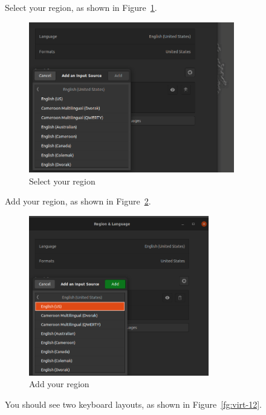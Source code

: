 Select your region, as shown in Figure~\ref{fg:virt-10}.

\begin{figure}[H]
\begin{center}
\includegraphics[width=0.8\textwidth]{virt-10}
\caption{Select your region}\label{fg:virt-10}
\end{center}
\end{figure}

Add your region, as shown in Figure~\ref{fg:virt-11}.

\begin{figure}[H]
\begin{center}
\includegraphics[width=0.7\textwidth]{virt-11}
\caption{Add your region}\label{fg:virt-11}
\end{center}
\end{figure}

You should see two keyboard layouts, as shown in Figure~\ref{fg:virt-12}.

